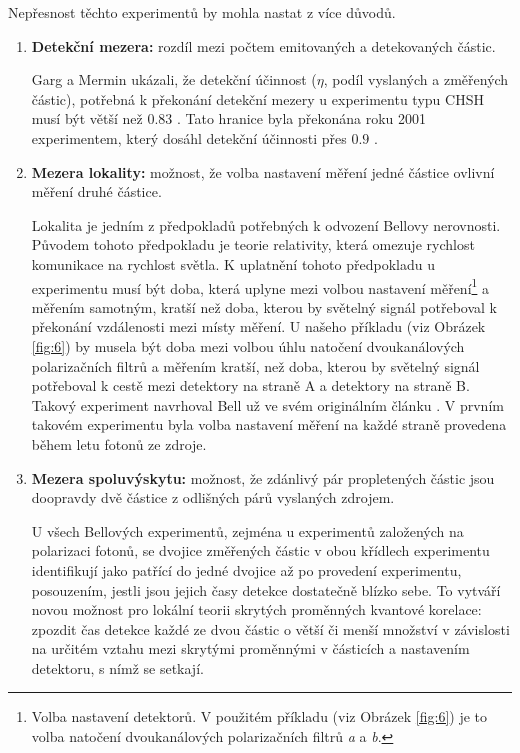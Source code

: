 Nepřesnost těchto experimentů by mohla nastat z více důvodů.
\begin{enumerate}
        \item \textbf{Detekční mezera:} rozdíl mezi počtem emitovaných a detekovaných částic. 

        Garg a Mermin ukázali, že detekční účinnost ($\eta$, podíl vyslaných a změřených částic), potřebná k překonání detekční mezery u experimentu typu CHSH musí být větší než $0.83$ \parencite*{det.efficiency}. Tato hranice byla překonána roku 2001 experimentem, který dosáhl detekční účinnosti přes $0.9$ \parencite{belltest:2001}.

        \item \textbf{Mezera lokality:} možnost, že volba nastavení měření jedné částice ovlivní měření druhé částice.

        Lokalita je jedním z předpokladů potřebných k odvození Bellovy nerovnosti. Původem tohoto předpokladu je teorie relativity, která omezuje rychlost komunikace na rychlost světla. K uplatnění tohoto předpokladu u experimentu musí být doba, která uplyne mezi volbou nastavení měření\footnote[3]{Volba nastavení detektorů. V použitém příkladu (viz Obrázek \ref{fig:6}) je to volba natočení dvoukanálových polarizačních filtrů \emph{a} a \emph{b}.} a měřením samotným, kratší než doba, kterou by světelný signál potřeboval k překonání vzdálenosti mezi místy měření. U našeho příkladu (viz Obrázek \ref{fig:6}) by musela být doba mezi volbou úhlu natočení dvoukanálových polarizačních filtrů a měřením kratší, než doba, kterou by světelný signál potřeboval k cestě mezi detektory na straně A a detektory na straně B. Takový experiment navrhoval Bell už ve svém originálním článku \parencite*{bellineq}. V prvním takovém experimentu \parencite{belltest:2} byla volba nastavení měření na každé straně provedena během letu fotonů ze zdroje.

        \item \textbf{Mezera spoluvýskytu:} možnost, že zdánlivý pár propletených částic jsou doopravdy dvě částice z odlišných párů vyslaných zdrojem.
        
        U všech Bellových experimentů, zejména u experimentů založených na polarizaci fotonů, se dvojice změřených částic v obou křídlech experimentu identifikují jako patřící do jedné dvojice až po provedení experimentu, posouzením, jestli jsou jejich časy detekce dostatečně blízko sebe. To vytváří novou možnost pro lokální teorii skrytých proměnných  kvantové korelace: zpozdit čas detekce každé ze dvou částic o větší či menší množství v závislosti na určitém vztahu mezi skrytými proměnnými v částicích a nastavením detektoru, s nímž se setkají.


\end{enumerate}
